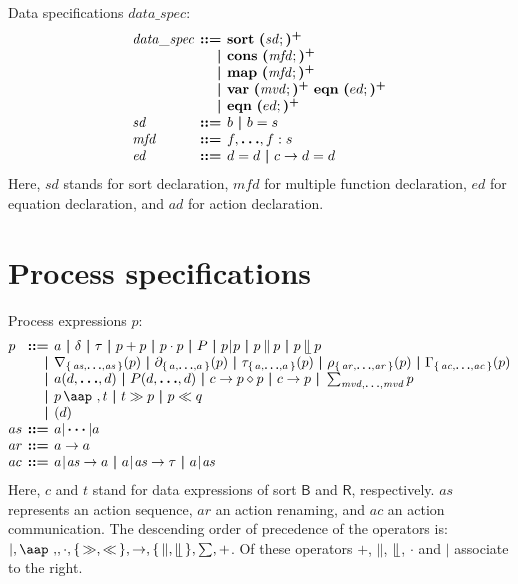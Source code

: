 \documentclass[a4paper,fleqn,10pt]{article}
\makeatletter
\newcommand{\f}[1]{\ensuremath{\mathit{#1}}}
\newcommand{\sbool}{\ensuremath{\mathsf{B}}}
\newcommand{\sreal}{\ensuremath{\mathsf{R}}}
\newenvironment{tightarray}[1]
  {\setlength{\arraycolsep}{2pt}%
   \begin{array}{@{}#1@{}}%
  }
  {\end{array}%
  }
\newcommand{\set}[1]{\ensuremath{\{\,#1\,\}}}
\newcommand{\seq}{\mathbin{\cdot}}
\newcommand{\alt}{\mathbin{+}}
\newcommand{\pmerge}{\mathbin{\parallel}}
\newcommand{\lmerge}{\mathbin{\llfloor}}
\newcommand{\sync}{\mathbin{\!\mid\!}}
\newcommand{\block}[1]{\partial_{#1}}
\newcommand{\hide}[1]{\tau_{#1}}
\newcommand{\ren}[1]{\rho_{#1}}
\newcommand{\allow}[1]{\nabla_{#1}}
\newcommand{\comm}[1]{\Gamma_{#1}}
\newcommand{\at}[1]{\mbox{\aap ,} #1}
\newcommand{\pinit}{\gg}
\newcommand{\pbefore}{\ll}
\newcommand{\mb}[1]{\text{\boldmath$#1$}}
\newcommand{\kwsort}{{\bf sort}}
\newcommand{\kwcons}{{\bf cons}}
\newcommand{\kwmap}{{\bf map}}
\newcommand{\kwvar}{{\bf var}}
\newcommand{\kweqn}{{\bf eqn}}
\makeatother
\begin{document}
Data specifications $\f{data\_spec}$:
\[\begin{tightarray}{lrl}
\f{data\_spec}
& \mb{::=} & \kwsort\ \mb{(}\f{sd};\mb{)^{+}}\\
& \mb{|}   & \kwcons\ \mb{(}\f{mfd};\mb{)^{+}}\\
& \mb{|}   & \kwmap\  \mb{(}\f{mfd};\mb{)^{+}}\\
& \mb{|}   & \kwvar\  \mb{(}\f{mvd};\mb{)^{+}}\ \kweqn\ \mb{(}ed;\mb{)^{+}}\\
& \mb{|}   & \kweqn\  \mb{(}ed;\mb{)^{+}}\\
\f{sd}  & \mb{::=} & b\ \mb{|}\ b = s\\
\f{mfd} & \mb{::=} & f, \mb{\ldots}, f: s\\
\f{ed}  & \mb{::=} & d = d\ \mb{|}\ c \to d = d\\
\end{tightarray}\]
Here, $\f{sd}$ stands for sort declaration,
$\f{mfd}$ for multiple function declaration,
$\f{ed}$ for equation declaration,
and $\f{ad}$ for action declaration.

\section{Process specifications}

Process expressions $p$:
\[\begin{tightarray}{lrl}
p   & \mb{::=} & a\ \mb{|}\ \delta\ \mb{|}\ \tau\ \mb{|}\ p \alt p\ \mb{|}\ p \seq p\ \mb{|}\ P\ \mb{|}\ 
            p \sync p\ \mb{|}\ p \pmerge p\ \mb{|}\ p \lmerge p\\
    & \mb{|} & \allow{\set{\f{as},\mb{\ldots},\f{as}}}(p)\ \mb{|}\ 
            \block{\set{a,\mb{\ldots},a}}(p)\ \mb{|}\ 
            \hide{\set{a,\mb{\ldots},a}}(p)\ \mb{|}\ 
            \ren{\set{\f{ar},\mb{\ldots},\f{ar}}}(p)\ \mb{|}\ 
            \comm{\set{\f{ac},\mb{\ldots},\f{ac}}}(p)\\
    & \mb{|} & a(d, \mb{\ldots}, d)\ \mb{|}\ 
            P(d, \mb{\ldots}, d)\ \mb{|}\ 
            c \to p \diamond p\ \mb{|}\ 
            c \to p\ \mb{|}\  
            \sum_{\f{mvd},\mb{\ldots},\f{mvd}}p\\
     & \mb{|} & p\,\at\,t\ \mb{|}\ t \pinit p\ \mb{|}\ p \pbefore q\\ 
     & \mb{|} & ( d )\\
as  & \mb{::=} & a |\,\mb{\cdots} | a\\
ar  & \mb{::=} & a \to a\\
ac  & \mb{::=} & a\sync\f{as} \to a\ \mb{|}\ a\sync\f{as} \to \tau\ \mb{|}\ a\sync\f{as}\\
\end{tightarray}\]
Here, $c$ and $t$ stand for data expressions of sort $\sbool$ and $\sreal$,
respectively. $\f{as}$ represents an action sequence, $\f{ar}$ an action
renaming, and $\f{ac}$ an action communication. The descending order of
precedence of the operators is: $\mid, \at, \seq, \set{\pinit, \pbefore}, \to,
\set{\pmerge,\lmerge},\sum,\alt$. Of these operators $\alt$, $\pmerge$,
$\lmerge$, $\seq$ and $\mid$ associate to the right.
\end{document}
